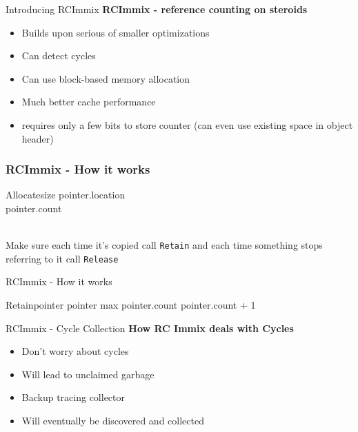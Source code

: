 \documentclass{beamer}
\begin{document}
\begin{frame}{Introducing RCImmix}
	\textbf{RCImmix - reference counting on steroids}
	\begin{itemize}
		\item Builds upon serious of smaller optimizations
		\item Can detect cycles
		\item Can use block-based memory allocation
		\item Much better cache performance
		\item requires only a few bits to store counter (can even use existing space in object header)
	\end{itemize}
\end{frame}

\addtocounter{section}{1}

\begin{frame}[fragile]
\frametitle{RCImmix - How it works}
	\begin{pseudocode}{Allocate}{size}
	pointer.location \GETS {}\\
	pointer.count \\
	\end{pseudocode}\\
	Make sure each time it's copied call \texttt{Retain} and each time something stops referring to it call \texttt{Release}
\end{frame}

\begin{frame}{RCImmix - How it works}
	\begin{pseudocode}{Retain}{pointer}
	\IF pointer \NOT max
		\THEN pointer.count \GETS pointer.count + 1
	\end{pseudocode}
		
\end{frame}

\begin{frame}{RCImmix - Cycle Collection}
	\textbf{How RC Immix deals with Cycles}
	\begin{itemize}
		\item Don't worry about cycles
		\item Will lead to unclaimed garbage
		\pause
		\item Backup tracing collector
		\item Will eventually be discovered and collected
	\end{itemize}
\end{frame}
\end{document}
